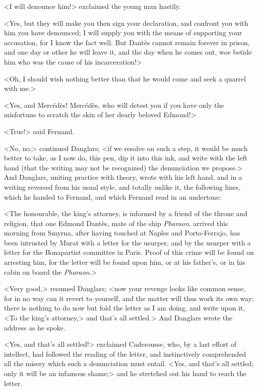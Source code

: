  <I will denounce him!> exclaimed the young man hastily. 

 <Yes, but they will make you then sign your declaration, and confront you with him you have denounced; I will supply you with the means of supporting your accusation, for I know the fact well. But Dantès cannot remain forever in prison, and one day or other he will leave it, and the day when he comes out, woe betide him who was the cause of his incarceration!> 

 <Oh, I should wish nothing better than that he would come and seek a quarrel with me.> 

 <Yes, and Mercédès! Mercédès, who will detest you if you have only the misfortune to scratch the skin of her dearly beloved Edmond!> 

 <True!> said Fernand. 

 <No, no,> continued Danglars; <if we resolve on such a step, it would be much better to take, as I now do, this pen, dip it into this ink, and write with the left hand (that the writing may not be recognized) the denunciation we propose.> And Danglars, uniting practice with theory, wrote with his left hand, and in a writing reversed from his usual style, and totally unlike it, the following lines, which he handed to Fernand, and which Fernand read in an undertone: 

 <The honourable, the king's attorney, is informed by a friend of the throne and religion, that one Edmond Dantès, mate of the ship \textit{Pharaon}, arrived this morning from Smyrna, after having touched at Naples and Porto-Ferrajo, has been intrusted by Murat with a letter for the usurper, and by the usurper with a letter for the Bonapartist committee in Paris. Proof of this crime will be found on arresting him, for the letter will be found upon him, or at his father's, or in his cabin on board the \textit{Pharaon}.> 

 <Very good,> resumed Danglars; <now your revenge looks like common sense, for in no way can it revert to yourself, and the matter will thus work its own way; there is nothing to do now but fold the letter as I am doing, and write upon it, <To the king's attorney,> and that's all settled.> And Danglars wrote the address as he spoke. 

 <Yes, and that's all settled!> exclaimed Caderousse, who, by a last effort of intellect, had followed the reading of the letter, and instinctively comprehended all the misery which such a denunciation must entail. <Yes, and that's all settled; only it will be an infamous shame;> and he stretched out his hand to reach the letter. 

